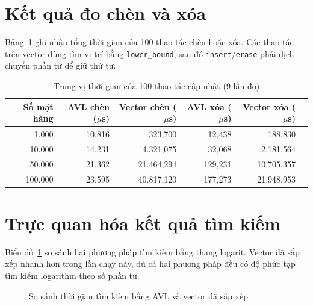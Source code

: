 \section{Kết quả đo chèn và xóa}
Bảng~\ref{tab:benchmark_update} ghi nhận tổng thời gian của 100 thao tác chèn hoặc xóa. Các thao tác trên vector dùng tìm vị trí bằng \texttt{lower\_bound}, sau đó \texttt{insert}/\texttt{erase} phải dịch chuyển phần tử để giữ thứ tự.

\begin{table}[H]
\centering
\caption{Trung vị thời gian của 100 thao tác cập nhật (9 lần đo)}
\label{tab:benchmark_update}
\small
\begin{tabular}{@{}rrrrrr@{}}
\toprule
\textbf{Số mặt hàng} & \textbf{AVL chèn ($\mu$s)} & \textbf{Vector chèn ($\mu$s)} & \textbf{AVL xóa ($\mu$s)} & \textbf{Vector xóa ($\mu$s)} \\
\midrule
1.000   & 10,816 & 323,700   & 12,438  & 188,830 \\
10.000  & 14,231 & 4.321,075 & 32,068  & 2.181,564 \\
50.000  & 21,362 & 21.464,294 & 129,231 & 10.705,357 \\
100.000 & 23,595 & 40.817,120 & 177,273 & 21.948,953 \\
\bottomrule
\end{tabular}
\end{table}

\section{Trực quan hóa kết quả tìm kiếm}
Biểu đồ~\ref{fig:chart_tv4} so sánh hai phương pháp tìm kiếm bằng thang logarit. Vector đã sắp xếp nhanh hơn trong lần chạy này, dù cả hai phương pháp đều có độ phức tạp tìm kiếm logarithm theo số phần tử.

\begin{figure}[H]
\centering
{}
\caption{So sánh thời gian tìm kiếm bằng AVL và vector đã sắp xếp}
\label{fig:chart_tv4}
\end{figure}

